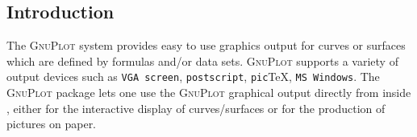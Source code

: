 



\newcommand{\Gnuplot}{\textsc{GnuPlot}}

\iffalse
\newpage
  Gnuplot
\newpage
\title{{\Gnuplot} Interface for REDUCE\\Version 4}
\author{Herbert Melenk \\ 
Konrad--Zuse--Zentrum f\"ur Informationstechnik Berlin \\
E--mail: Melenk@zib.de}
\maketitle

\fi



\subsection{Introduction}

The {\Gnuplot} system provides easy to use graphics output for curves or surfaces
which are defined by formulas and/or data sets.  {\Gnuplot} supports a variety of
output devices such as
\verb+VGA screen+, \verb+postscript+, \verb+pic+\TeX, \verb+MS Windows+.
The {\REDUCE} {\Gnuplot} package lets one use the {\Gnuplot} graphical output
directly from inside {\REDUCE}, either for the interactive display of
curves/surfaces or for the production of pictures on paper.

\iffalse
{\REDUCE} supports {\Gnuplot} 3.4 (or higher).  For DOS, Windows, Windows 95,
Windows NT, OS/2 and Unix versions of {\REDUCE} {\Gnuplot} binaries are delivered
together with {\REDUCE}\footnote{The {\Gnuplot} developers have agreed that {\Gnuplot}
binaries can be distributed together with {\REDUCE}.  As {\Gnuplot} is a package
distributed without cost, the {\Gnuplot} support of {\REDUCE} also is an add-on to
the {\REDUCE} kernel system without charge.  We recommend fetching the full
{\Gnuplot} system by anonymous FTP from a file server.  } %
. However, this is a basic set only.  If you intend to use more facilities of
the {\Gnuplot} system you should pick up the full {\Gnuplot} file tree
from \url{http://sourceforge.net/projects/gnuplot}.
\fi


